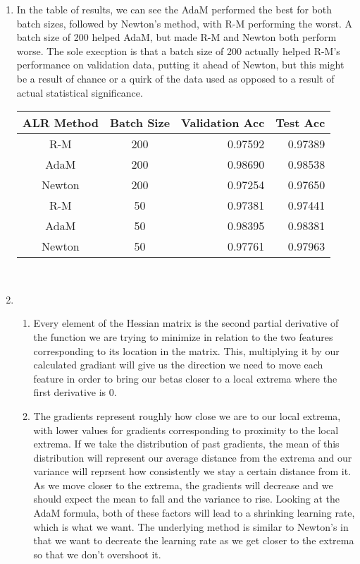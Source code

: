 \documentclass[11pt]{article}
\begin{document}
\begin{enumerate}
\item
In the table of results, we can see the AdaM performed the best for both batch sizes, followed by Newton's method, with R-M performing the worst. A batch size of 200 helped AdaM, but made R-M and Newton both perform worse. The sole execption is that a batch size of 200 actually helped R-M's performance on validation data, putting it ahead of Newton, but this might be a result of chance or a quirk of the data used as opposed to a result of actual statistical significance. 

\begin{tabular}{|cc|rr|}
\hline
ALR Method & Batch Size & Validation Acc & Test Acc \\
\hline
R-M & 200 & 0.97592 & 0.97389 \\
AdaM & 200 & 0.98690 & 0.98538 \\
Newton & 200 & 0.97254 & 0.97650 \\
R-M & 50 & 0.97381 & 0.97441 \\
AdaM & 50 & 0.98395 & 0.98381 \\
Newton & 50 & 0.97761 & 0.97963 \\
\hline
\end{tabular}
\\
\item
\begin{enumerate}
\item
Every element of the Hessian matrix is the second partial derivative of the function we are trying to minimize in relation to the two features corresponding to its location in the matrix. This, multiplying it by our calculated gradiant will give us the direction we need to move each feature in order to bring our betas closer to a local extrema where the first derivative is 0.	

\item
The gradients represent roughly how close we are to our local extrema, with lower values for gradients corresponding to proximity to the local extrema. If we take the distribution of past gradients, the mean of this distribution will represent our average distance from the extrema and our variance will reprsent how consistently we stay a certain distance from it. As we move closer to the extrema, the gradients will decrease and we should expect the mean to fall and the variance to rise. Looking at the AdaM formula, both of these factors will lead to a shrinking learning rate, which is what we want. The underlying method is similar to Newton's in that we want to decreate the learning rate as we get closer to the extrema so that we don't overshoot it.


\end{enumerate}
\end{enumerate}
\end{document}
